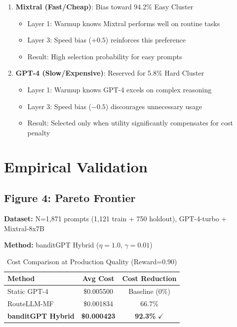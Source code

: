 \documentclass[sigconf]{acmart}
\begin{document}
\begin{enumerate}
    \item \textbf{Mixtral (Fast/Cheap)}: Bias toward 94.2\% Easy Cluster
    \begin{itemize}
        \item Layer 1: Warmup knows Mixtral performs well on routine tasks
        \item Layer 3: Speed bias ($+0.5$) reinforces this preference
        \item Result: High selection probability for easy prompts
    \end{itemize}
    
    \item \textbf{GPT-4 (Slow/Expensive)}: Reserved for 5.8\% Hard Cluster
    \begin{itemize}
        \item Layer 1: Warmup knows GPT-4 excels on complex reasoning
        \item Layer 3: Speed bias ($-0.5$) discourages unnecessary usage
        \item Result: Selected only when utility significantly compensates for cost penalty
    \end{itemize}
\end{enumerate}

\section{Empirical Validation}

\subsection{Figure 4: Pareto Frontier}

\textbf{Dataset:} N=1,871 prompts (1,121 train + 750 holdout), GPT-4-turbo + Mixtral-8x7B

\textbf{Method:} banditGPT Hybrid ($\eta=1.0$, $\gamma=0.01$)

\begin{table}[h]
\centering
\caption{Cost Comparison at Production Quality (Reward=0.90)}
\label{tab:results}
\begin{tabular}{@{}lcc@{}}
\toprule
Method & Avg Cost & Cost Reduction \\
\midrule
Static GPT-4 & \$0.005500 & Baseline (0\%) \\
RouteLLM-MF & \$0.001834 & 66.7\% \\
\textbf{banditGPT Hybrid} & \textbf{\$0.000423} & \textbf{92.3\%} $\checkmark$ \\
\bottomrule
\end{tabular}
\end{table}
\end{document}
